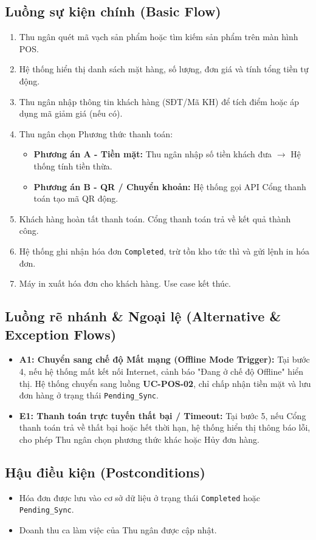 \documentclass[11pt,a4paper]{article}
\begin{document}
	\subsection*{Luồng sự kiện chính (Basic Flow)}
	\begin{enumerate}
		\item Thu ngân quét mã vạch sản phẩm hoặc tìm kiếm sản phẩm trên màn hình POS.
		\item Hệ thống hiển thị danh sách mặt hàng, số lượng, đơn giá và tính tổng tiền tự động.
		\item Thu ngân nhập thông tin khách hàng (SĐT/Mã KH) để tích điểm hoặc áp dụng mã giảm giá (nếu có).
		\item Thu ngân chọn Phương thức thanh toán:
		\begin{itemize}
			\item \textbf{Phương án A - Tiền mặt:} Thu ngân nhập số tiền khách đưa $\rightarrow$ Hệ thống tính tiền thừa.
			\item \textbf{Phương án B - QR / Chuyển khoản:} Hệ thống gọi API Cổng thanh toán tạo mã QR động.
		\end{itemize}
		\item Khách hàng hoàn tất thanh toán. Cổng thanh toán trả về kết quả thành công.
		\item Hệ thống ghi nhận hóa đơn \texttt{Completed}, trừ tồn kho tức thì và gửi lệnh in hóa đơn.
		\item Máy in xuất hóa đơn cho khách hàng. Use case kết thúc.
	\end{enumerate}
	
	\subsection*{Luồng rẽ nhánh \& Ngoại lệ (Alternative \& Exception Flows)}
	\begin{itemize}
		\item \textbf{A1: Chuyển sang chế độ Mất mạng (Offline Mode Trigger):} Tại bước 4, nếu hệ thống mất kết nối Internet, cảnh báo "Đang ở chế độ Offline" hiển thị. Hệ thống chuyển sang luồng \textbf{UC-POS-02}, chỉ chấp nhận tiền mặt và lưu đơn hàng ở trạng thái \texttt{Pending\_Sync}.
		\item \textbf{E1: Thanh toán trực tuyến thất bại / Timeout:} Tại bước 5, nếu Cổng thanh toán trả về thất bại hoặc hết thời hạn, hệ thống hiển thị thông báo lỗi, cho phép Thu ngân chọn phương thức khác hoặc Hủy đơn hàng.
	\end{itemize}
	
	\subsection*{Hậu điều kiện (Postconditions)}
	\begin{itemize}
		\item Hóa đơn được lưu vào cơ sở dữ liệu ở trạng thái \texttt{Completed} hoặc \texttt{Pending\_Sync}.
		\item Doanh thu ca làm việc của Thu ngân được cập nhật.
	\end{itemize}
	
\end{document}

